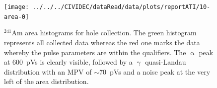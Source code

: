 \begin{figure}[]
\centering
\texttt{[image: ../../../CIVIDEC/dataRead/data/plots/reportATI/10-area-0]}
\caption{$^{241}$Am area histograms for hole collection. The green histogram represents all collected data whereas the red one marks the data whereby the pulse parameters are within the qualifiers. The $\upalpha$ peak at 600~pVs is clearly visible, followed by a $\upgamma$ quasi-Landau distribution with an MPV of $\sim$70~pVs and a noise peak at the very left of the area distribution. 
}
\label{fig:1dalphaareah}
\end{figure}
%
%
%
%
%
%


